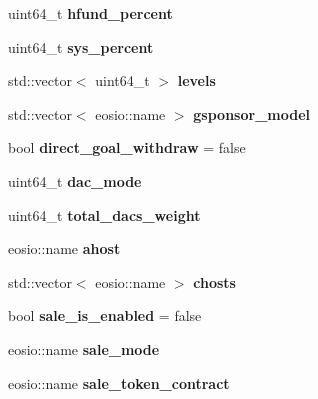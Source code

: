 \begin{DoxyCompactItemize}
uint64\+\_\+t {\bfseries hfund\+\_\+percent}
\item 
\mbox{\label{structeosio_1_1hosts_a5f5a805a7752a45444f7a6adb2f99d76}} 
uint64\+\_\+t {\bfseries sys\+\_\+percent}
\item 
\mbox{\label{structeosio_1_1hosts_a8e9583571dfcd3ddfc5faa6847866d24}} 
std\+::vector$<$ uint64\+\_\+t $>$ {\bfseries levels}
\item 
\mbox{\label{structeosio_1_1hosts_ad046c0e8b4c59cc4349d2df5c580cb33}} 
std\+::vector$<$ eosio\+::name $>$ {\bfseries gsponsor\+\_\+model}
\item 
\mbox{\label{structeosio_1_1hosts_a7c0cd54c7288e95a70d5bfae1e9953f0}} 
bool {\bfseries direct\+\_\+goal\+\_\+withdraw} = false
\item 
\mbox{\label{structeosio_1_1hosts_a257be2d2f298adb8963a24caaea30a59}} 
uint64\+\_\+t {\bfseries dac\+\_\+mode}
\item 
\mbox{\label{structeosio_1_1hosts_aa82ae46d0d659f9283094f7457f55c36}} 
uint64\+\_\+t {\bfseries total\+\_\+dacs\+\_\+weight}
\item 
\mbox{\label{structeosio_1_1hosts_a7cafe9409dd54f72d494fed27fbea287}} 
eosio\+::name {\bfseries ahost}
\item 
\mbox{\label{structeosio_1_1hosts_a699983d703aed365ae1ebee541f702a0}} 
std\+::vector$<$ eosio\+::name $>$ {\bfseries chosts}
\item 
\mbox{\label{structeosio_1_1hosts_ada1dc93cc0fd86459567bc78e397fba2}} 
bool {\bfseries sale\+\_\+is\+\_\+enabled} = false
\item 
\mbox{\label{structeosio_1_1hosts_ae9923be088fcf1c8d3872d922d4776ca}} 
eosio\+::name {\bfseries sale\+\_\+mode}
\item 
\mbox{\label{structeosio_1_1hosts_a1f120ff61d16f471008a4163324aeb8d}} 
eosio\+::name {\bfseries sale\+\_\+token\+\_\+contract}

\end{DoxyCompactItemize}
